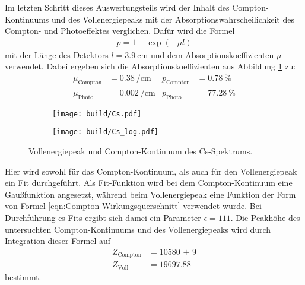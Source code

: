 Im letzten Schritt dieses Auswertungsteils wird der Inhalt des Compton-Kontinuums
und des Vollenergiepeaks mit der Absorptionswahrscheilichkeit des Compton- und
Photoeffektes verglichen. Dafür wird die Formel
\begin{align*}
	p = 1 - \exp\left(-\mu l\right)
\end{align*}
mit der Länge des Detektors $l = \SI{3.9}{\centi\meter}$ und dem
Absorptionskoeffizienten $\mu$ verwendet. Dabei ergeben sich die
Absorptionskoeffizienten aus Abbildung \ref{plt:Cs_abs} zu:
\begin{align*}
	\mu_\text{Compton} &= \SI{0.38}{\per\centi\meter} & p_\text{Compton} &= \SI{0.78}{\percent} \\
	\mu_\text{Photo} &= \SI{0.002}{\per\centi\meter} & p_\text{Photo} &= \SI{77.28}{\percent}
\end{align*}
\begin{figure}
  \begin{subfigure}{0.49\textwidth}
    \centering
    \texttt{[image: build/Cs.pdf]}
  \end{subfigure}
  \begin{subfigure}{0.49\textwidth}
    \centering
    \texttt{[image: build/Cs\_log.pdf]}
  \end{subfigure}
  \caption{Vollenergiepeak und Compton-Kontinuum des Cs-Spektrums.}
  \label{plt:Cs_abs}
\end{figure}
Hier wird sowohl für das Compton-Kontinuum, als auch für den Vollenergiepeak ein
Fit durchgeführt. Als Fit-Funktion wird bei dem Compton-Kontinuum eine
Gaußfunktion angesetzt, während beim Vollenergiepeak eine Funktion der Form von
Formel \eqref{eqn:Compton-Wirkungsquerschnitt} verwendet wurde. Bei Durchführung
es Fits ergibt sich damei ein Parameter $\epsilon = \num{111}$. Die Peakhöhe des
untersuchten Compton-Kontinuums und des Vollenergiepeaks wird durch
Integration dieser Formel auf
\begin{align*}
  Z_\text{Compton} &= \num{10580(9)} \\
  Z_\text{Voll} &= \num{19697.88}
\end{align*}
bestimmt.


